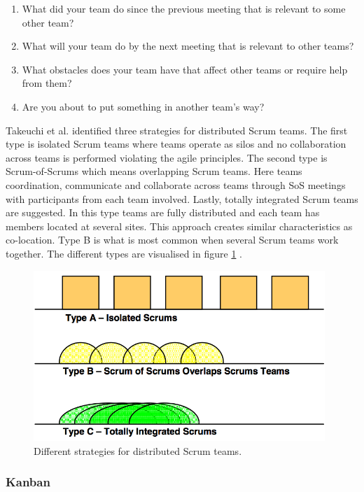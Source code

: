 \begin{enumerate}
  \item What did your team do since the previous meeting that is relevant to some other team?
  \item What will your team do by the next meeting that is relevant to other teams?
  \item What obstacles does your team have that affect other teams or require help from them?
  \item Are you about to put something in another team's way?
\end{enumerate}

Takeuchi et al. identified three strategies for distributed Scrum teams. The first type is isolated Scrum teams where teams operate as silos and no collaboration across teams is performed violating the agile principles. The second type is Scrum-of-Scrums which means overlapping Scrum teams. Here teams coordination, communicate and collaborate across teams through SoS meetings with participants from each team involved. Lastly, totally integrated Scrum teams are suggested. In this type teams are fully distributed and each team has members located at several sites. This approach creates similar characteristics as co-location. Type B is what is most common when several Scrum teams work together. The different types are visualised in figure \ref{distributedscrum} \cite{takeuchi2004}.

\begin{figure}[ht!]
\centering
\includegraphics[width=110mm]{images/distributed_scrum.png}
\caption{Different strategies for distributed Scrum teams.}
\label{distributedscrum}
\end{figure}

\subsubsection{Kanban}

